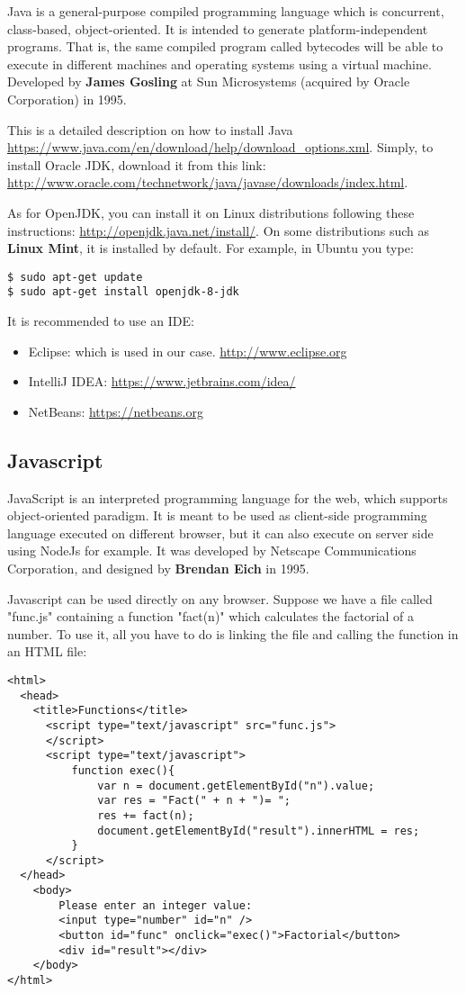 \documentclass{KBook}
\begin{document}
Java is a general-purpose compiled programming language which is concurrent, class-based, object-oriented. 
It is intended to generate platform-independent programs. 
That is, the same compiled program called bytecodes will be able to execute in different machines and operating systems using a virtual machine. 
Developed by \textbf{James Gosling} at Sun Microsystems (acquired by Oracle Corporation) in 1995.

This is a detailed description on how to install Java \url{https://www.java.com/en/download/help/download_options.xml}.
Simply, to install Oracle JDK, download it from this link: \url{http://www.oracle.com/technetwork/java/javase/downloads/index.html}. 

As for OpenJDK, you can install it on Linux distributions following these instructions: \url{http://openjdk.java.net/install/}. 
On some distributions such as \textbf{Linux Mint}, it is installed by default.
For example, in Ubuntu you type:
\begin{lstlisting}[style=shellStyle]
$ sudo apt-get update
$ sudo apt-get install openjdk-8-jdk
\end{lstlisting}

It is recommended to use an IDE:
\begin{itemize}
	\item Eclipse: which is used in our case. \url{http://www.eclipse.org}
	\item IntelliJ IDEA: \url{https://www.jetbrains.com/idea/}
	\item NetBeans: \url{https://netbeans.org}
\end{itemize}

\subsection{Javascript}

JavaScript is an interpreted programming language for the web, which supports object-oriented paradigm. 
It is meant to be used as client-side programming language executed on different browser, but it can also execute on server side using NodeJs for example.
It was developed by Netscape Communications Corporation, and designed by \textbf{Brendan Eich} in 1995. 

Javascript can be used directly on any browser. 
Suppose we have a file called "func.js" containing a function "fact(n)" which calculates the factorial of a number. 
To use it, all you have to do is linking the file and calling the function in an HTML file:
\begin{lstlisting}[style=codeStyle]
<html>
  <head>
    <title>Functions</title>
      <script type="text/javascript" src="func.js">
      </script>
      <script type="text/javascript">
          function exec(){
              var n = document.getElementById("n").value;
              var res = "Fact(" + n + ")= ";
              res += fact(n);
              document.getElementById("result").innerHTML = res;
          }
      </script>
  </head>
    <body>
        Please enter an integer value: 
        <input type="number" id="n" />
        <button id="func" onclick="exec()">Factorial</button>
        <div id="result"></div>
    </body>
</html>
\end{lstlisting}
\end{document}
